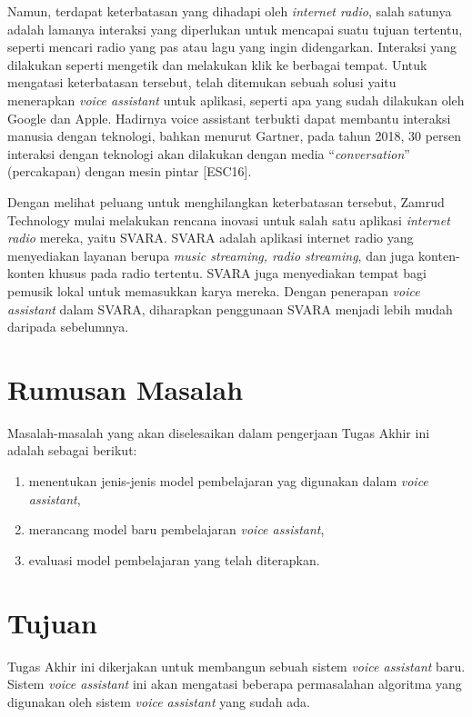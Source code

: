 Namun, terdapat keterbatasan yang dihadapi oleh \textit{internet radio}, salah satunya adalah lamanya interaksi yang diperlukan untuk mencapai suatu tujuan tertentu, seperti mencari radio yang pas atau lagu yang ingin didengarkan. Interaksi yang dilakukan seperti mengetik dan melakukan klik ke berbagai tempat. Untuk mengatasi keterbatasan tersebut, telah ditemukan sebuah solusi yaitu menerapkan \textit{voice assistant} untuk aplikasi, seperti apa yang sudah dilakukan oleh Google dan Apple. Hadirnya voice assistant terbukti dapat membantu interaksi manusia dengan teknologi, bahkan menurut Gartner, pada tahun 2018, 30 persen interaksi dengan teknologi akan dilakukan dengan media “\textit{conversation}” (percakapan) dengan mesin pintar [ESC16].

Dengan melihat peluang untuk menghilangkan keterbatasan tersebut, Zamrud Technology mulai melakukan rencana inovasi untuk salah satu aplikasi \textit{internet radio} mereka, yaitu SVARA. SVARA adalah aplikasi internet radio yang menyediakan layanan berupa \textit{music streaming, radio streaming}, dan juga konten-konten khusus pada radio tertentu. SVARA juga menyediakan tempat bagi pemusik lokal untuk memasukkan karya mereka. Dengan penerapan \textit{voice assistant} dalam SVARA, diharapkan penggunaan SVARA menjadi lebih mudah daripada sebelumnya.

\section{Rumusan Masalah}

Masalah-masalah yang akan diselesaikan dalam pengerjaan Tugas Akhir ini adalah sebagai berikut:

\begin{enumerate}
    \item menentukan jenis-jenis model pembelajaran yag digunakan dalam \textit{voice assistant},
    \item merancang model baru pembelajaran \textit{voice assistant},
    \item evaluasi model pembelajaran yang telah diterapkan.
\end{enumerate}

\section{Tujuan}

Tugas Akhir ini dikerjakan untuk membangun sebuah sistem \textit{voice assistant} baru. Sistem \textit{voice assistant} ini akan mengatasi beberapa permasalahan algoritma yang digunakan oleh sistem \textit{voice assistant} yang sudah ada.

